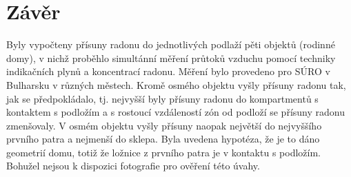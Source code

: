 \section{Závěr}
Byly vypočteny přísuny radonu do jednotlivých podlaží pěti objektů (rodinné domy), v nichž proběhlo simultánní měření průtoků vzduchu pomocí techniky indikačních plynů a koncentrací radonu. Měření bylo provedeno pro SÚRO v Bulharsku v různých městech. Kromě osmého objektu vyšly přísuny radonu tak, jak se předpokládalo, tj. nejvyšší byly přísuny radonu do kompartmentů s kontaktem s podložím a s rostoucí vzdáleností zón od podloží se přísuny radonu zmenšovaly. V osmém objektu vyšly přísuny naopak největší do nejvyššího prvního patra a nejmenší do sklepa. Byla uvedena hypotéza, že je to dáno geometrií domu, totiž že ložnice z prvního patra je v kontaktu s podložím. Bohužel nejsou k dispozici fotografie pro ověření této úvahy.
